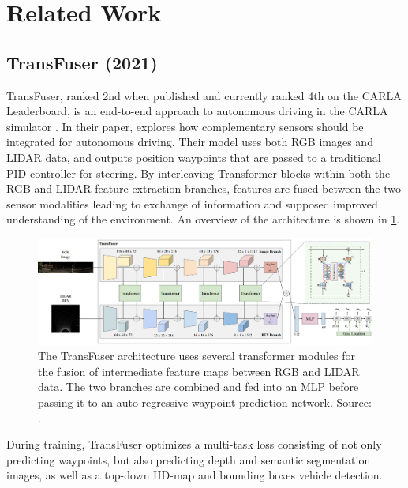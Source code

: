\section{Related Work}
\label{sec:related-work}

\subsection{TransFuser (2021)}
\label{sec:related-work:transfuser}
TransFuser, ranked 2nd when published and currently ranked 4th on the CARLA Leaderboard,
is an end-to-end approach to autonomous driving in the CARLA simulator
\cite{transfuser-pami, transfuser-cvpr, pwc-carla}.
In their paper, \textcite{transfuser-pami} explores how complementary sensors should be integrated for autonomous driving. Their model uses both RGB images and LIDAR data, and outputs position waypoints that are passed to a traditional PID-controller for steering.
By interleaving Transformer-blocks within both the RGB and LIDAR feature extraction branches,
features are fused between the two sensor modalities leading to exchange of information and supposed improved understanding of the environment. An overview of the architecture is shown in \cref{fig:transfuser-architecture}.

\begin{figure}[htbp]
    \centering
    \includegraphics[width=\textwidth]{figures/2/transfuser-architecture.png}
    \caption{The TransFuser architecture uses several transformer modules for the fusion of intermediate feature maps between RGB and LIDAR data. The two branches are combined and fed into an MLP before passing it to an auto-regressive waypoint prediction network.  Source: \cite{transfuser-pami}.}
    \label{fig:transfuser-architecture}
\end{figure}

During training, TransFuser optimizes a multi-task loss consisting of not only predicting waypoints,
but also predicting depth and semantic segmentation images,
as well as a top-down HD-map and bounding boxes vehicle detection.

